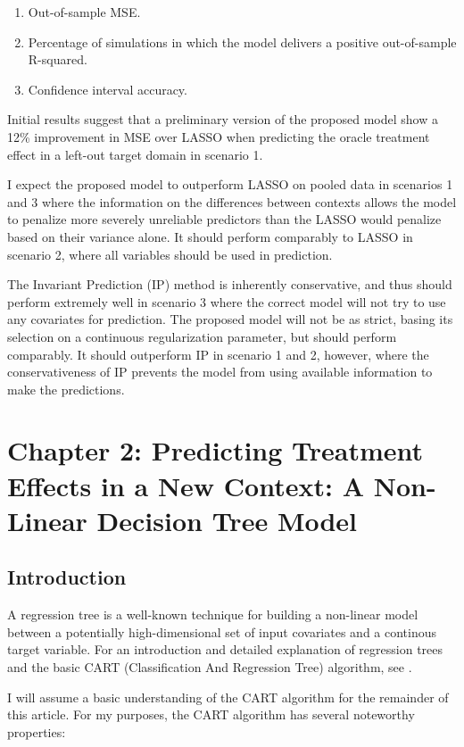 \documentclass[a4paper,12pt]{article}
\begin{document}
\begin{enumerate}
\item Out-of-sample MSE.
\item Percentage of simulations in which the model delivers a positive out-of-sample R-squared.
\item Confidence interval accuracy.
\end{enumerate}

Initial results suggest that a preliminary version of the proposed model show a 12\% improvement in MSE over LASSO when predicting the oracle treatment effect in a left-out target domain in scenario 1.

I expect the proposed model to outperform LASSO on pooled data in scenarios 1 and 3 where the information on the differences between contexts allows the model to penalize more severely unreliable predictors than the LASSO would penalize based on their variance alone. It should perform comparably to LASSO in scenario 2, where all variables should be used in prediction.

The Invariant Prediction (IP) method is inherently conservative, and thus should perform extremely well in scenario 3 where the correct model will not try to use any covariates for prediction. The proposed model will not be as strict, basing its selection on a continuous regularization parameter, but should perform comparably. It should outperform IP in scenario 1 and 2, however, where the conservativeness of IP prevents the model from using available information to make the predictions.


\section{ Chapter 2: Predicting Treatment Effects in a New Context: A Non-Linear Decision Tree Model }

\subsection{ Introduction }

A regression tree is a well-known technique for building a non-linear model between a potentially high-dimensional set of input covariates and a continous target variable. For an introduction and detailed explanation of regression trees and the basic CART (Classification And Regression Tree) algorithm, see \cite{}.

I will assume a basic understanding of the CART algorithm for the remainder of this article. For my purposes, the CART algorithm has several noteworthy properties:
\end{document}
